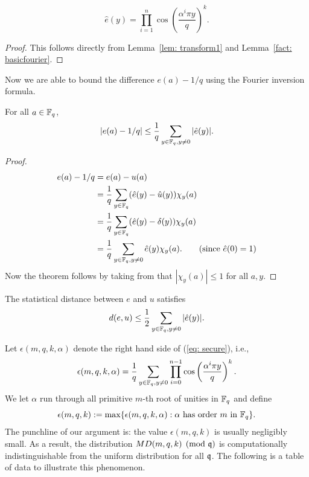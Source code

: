 \documentclass{amsart}
\begin{document}
\begin{Lemma}
\label{lem: transform2}
\[
    \widehat{e}(y) = \prod_{i=1}^{n} \cos \left(\frac{ \alpha^i \pi y}{q} \right)^k.
\]
\end{Lemma}

\begin{proof}
This follows directly from Lemma~\ref{lem: transform1} and Lemma~\ref{fact: basicfourier}.
\end{proof}

Now we are able to bound the difference $e(a) - 1/q$ using the Fourier inversion formula.

\begin{theorem}
For all $a \in \mathbb{F}_q$,
\begin{equation} \label{eq: secure}
    |e(a) -  1/q| \leq \frac{1}{q}  \sum_{y \in \mathbb{F}_q, y \neq 0}  |\hat{e}(y)|.
\end{equation}
\end{theorem}

\begin{proof}
\begin{align*}
    e(a) - 1/q &= e(a) - u(a) \\
    & = \frac{1}{q} \sum_{y \in \mathbb{F}_q} (\hat{e}(y) - \hat{u}(y) )\chi_y(a) \\
& = \frac{1}{q} \sum_{y \in \mathbb{F}_q} (\hat{e}(y) - \delta(y) )\chi_y(a) \\
& = \frac{1}{q} \sum_{y \in \mathbb{F}_q, y \neq 0} \hat{e}(y) \chi_y(a).  \qquad \mbox{(since $\hat{e}(0) = 1$)}
\end{align*}
Now the theorem follows by taking from that $|\chi_y(a)| \leq 1$ for all $a, y$.
\end{proof}

\begin{Corollary}
The statistical distance between $e$ and $u$ satisfies $$d(e,u) \leq \frac{1}{2}  \sum_{y \in \mathbb{F}_q, y \neq 0}  |\hat{e}(y)|.$$
\end{Corollary}



Let $\epsilon(m,q,k,\alpha)$ denote the right hand side of (\ref{eq: secure}), i.e.,
\[
    \epsilon(m,q,k, \alpha) = \frac{1}{q}\sum_{y \in \mathbb{F}_q, y \neq 0} \prod_{i=0}^{n-1} \cos \left(\frac{ \alpha^i \pi y}{q} \right)^k.
\]
We let $\alpha$ run through all primitive $m$-th root of unities in $\mathbb{F}_q$ and define
$$\epsilon(m,q,k) := \max \{\epsilon(m,q,k,\alpha): \alpha \mbox{ has order } m \mbox{ in } \mathbb{F}_q\}.$$
The punchline of our argument is: the value $\epsilon(m,q,k)$ is usually negligibly small. As a result, the distribution $MD(m,q,k) \pmod {\mathfrak{q}}$ is computationally indistinguishable from the uniform distribution for all $\mathfrak{q}$. The following is a table of data to illustrate this phenomenon.
\end{document}
